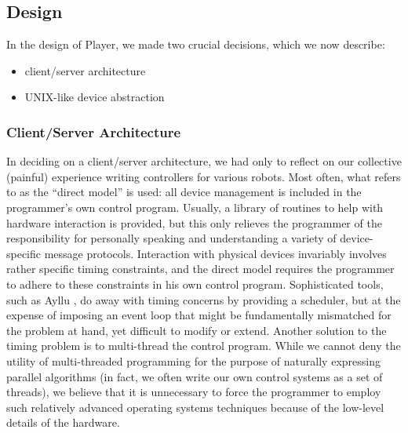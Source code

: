 \documentclass[]{article}
\begin{document}
\subsection{Design}
In the design of Player, we made two crucial decisions, which we now
describe:
\begin{itemize}
\item client/server architecture
\item UNIX-like device abstraction
\end{itemize}

\subsubsection{Client/Server Architecture}
In deciding on a client/server architecture, we had only to reflect on our 
collective (painful) experience writing controllers for various
robots.  Most often, what \cite{Jennings98} refers to as the ``direct model'' 
is used: all device management is included in the 
programmer's own control program.  Usually, a library of routines to help
with hardware interaction is provided, but this only relieves the programmer
of the responsibility for personally speaking and understanding a variety of
device-specific message protocols.  Interaction with physical devices 
invariably involves rather specific timing constraints, and the direct model
requires the programmer to adhere to these constraints in his own control
program.  Sophisticated tools, such as Ayllu \cite{Werger00}, do
away with timing concerns by providing a scheduler, but at the expense 
of imposing an event loop that might be fundamentally mismatched for the 
problem at hand, yet difficult to modify or extend.  Another solution to the
timing problem is to multi-thread the control program.  While we cannot deny
the utility of multi-threaded programming for the purpose of naturally 
expressing parallel algorithms (in fact, we often write our own control systems
as a set of threads), we believe that it is unnecessary to force the 
programmer to employ such relatively advanced operating systems techniques
because of the low-level details of the hardware.
\end{document}
